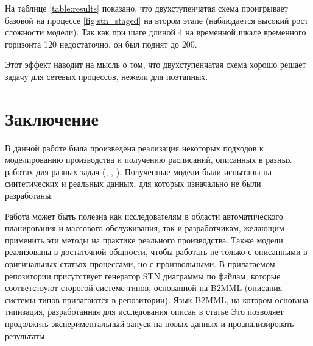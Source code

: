 \documentclass[12pt, twoside]{article}
\theoremstyle{definition}
\begin{document}
\begin{center}
	\begin{table}
\centering
\renewcommand{\arraystretch}{2}
		\caption{Количество переменных и ограничений для разных заказов на производство процесса \ref{fig:stn_exmp}}
		\label{table:results}
	\end{table}

\end{center}
На таблице \ref{table:results} показано, что двухступенчатая схема проигрывает базовой на процессе \ref{fig:stn_staged} на втором этапе (наблюдается высокий рост сложности модели). Так как при шаге длиной 4 на временной шкале временного горизонта 120 недостаточно, он был поднят до 200.

Этот эффект наводит на мысль о том, что двухступенчатая схема хорошо решает задачу для сетевых процессов, нежели для поэтапных.

\section{Заключение}
В данной работе была произведена реализация некоторых подходов к моделированию производства и получению расписаний, описанных в разных работах для разных задач (\cite{lpheuristic}, \cite{reallife}, \cite{precendancebased}). Полученные модели были испытаны на синтетических и реальных данных, для которых изначально не были разработаны.

Работа может быть полезна как исследователям в области автоматического планирования и массового обслуживания, так и разработчикам, желающим применить эти методы на практике реального производства. Также модели реализованы в достаточной общности, чтобы работать не только с описанными в оригинальных статьях процессами, но с произвольными. В прилагаемом репозитории присутствует генератор STN диаграммы по файлам, которые соответствуют сторогой системе типов, основанной на B2MML (описания системы типов прилагаются в репозитории). Язык B2MML, на котором основана типизация, разработанная для исследования описан в статье \cite{b2mml} Это позволяет продолжить экспериментальный запуск на новых данных и проанализировать результаты.
\end{document}
